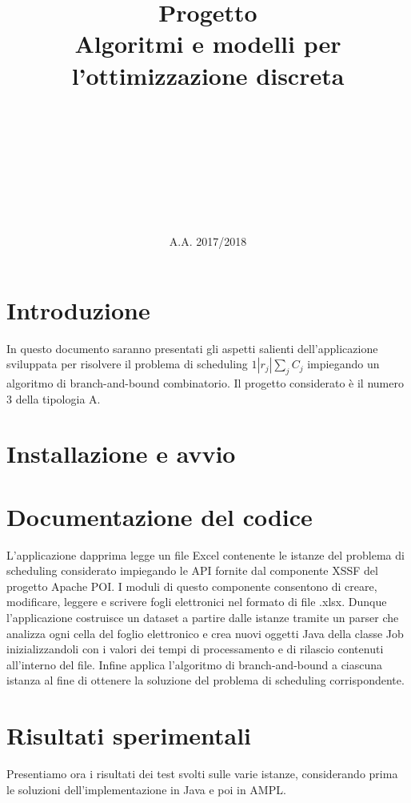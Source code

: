\documentclass[a4paper]{article}
\title{Progetto\\
	Algoritmi e modelli per l'ottimizzazione discreta\\
}
\author{
	\text{Scarpitta}\\
	\text{email}\\
	\text{matricola}
	\and
	\text{Schmidt}\\
	\text{email}\\
	\text{matricola}
	\and
	\text{Tranzocchi}\\
	\text{email}\\
	\text{matricola}
}
\date{A.A. 2017/2018}
\begin{document}
\maketitle

\newpage


\section{Introduzione}
In questo documento saranno presentati gli aspetti salienti dell'applicazione sviluppata per risolvere il problema di scheduling $1 | r_j | \sum_{j} C_j$ impiegando un algoritmo di branch-and-bound combinatorio. Il progetto considerato è il numero 3 della tipologia A.

\section{Installazione e avvio}

\section{Documentazione del codice}
L'applicazione dapprima legge un file Excel contenente le istanze del problema di scheduling considerato impiegando le API fornite dal componente XSSF del progetto Apache POI. I moduli di questo componente consentono di creare, modificare, leggere e scrivere fogli elettronici nel formato di file .xlsx. Dunque l'applicazione costruisce un dataset a partire dalle istanze tramite un parser che analizza ogni cella del foglio elettronico e crea nuovi oggetti Java della classe Job inizializzandoli con i valori dei tempi di processamento e di rilascio contenuti all'interno del file. Infine applica l'algoritmo di branch-and-bound a ciascuna istanza al fine di ottenere la soluzione del problema di scheduling corrispondente.


\section{Risultati sperimentali}
Presentiamo ora i risultati dei test svolti sulle varie istanze, considerando prima le soluzioni dell'implementazione in Java e poi in AMPL.
\end{document}
